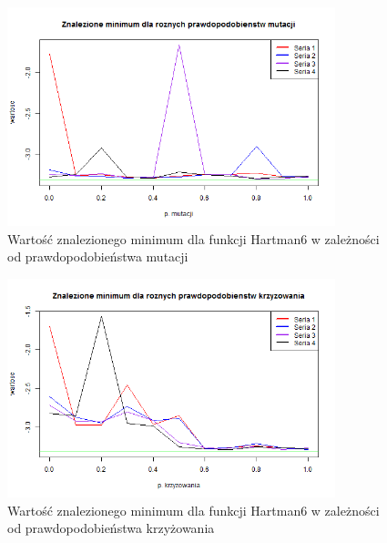 \documentclass[11pt, a4paper]{article}
\begin{document}
\begin{figure}[H]
	\begin{center}
		\includegraphics[width=0.85\textwidth]{./assets/Hartman62.png}
		\caption{Wartość znalezionego minimum dla funkcji Hartman6 w zależności od prawdopodobieństwa mutacji}
		\label{fig:hartman62}
	\end{center}
\end{figure}

\begin{figure}[H]
	\begin{center}
		\includegraphics[width=0.85\textwidth]{./assets/Hartman63.png}
		\caption{Wartość znalezionego minimum dla funkcji Hartman6 w zależności od prawdopodobieństwa krzyżowania}
		\label{fig:hartman63}
	\end{center}
\end{figure}
\end{document}
